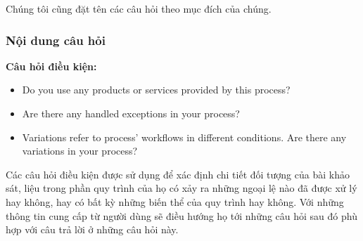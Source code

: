 \par
Chúng tôi cũng đặt tên các câu hỏi theo mục đích của chúng.
\begin{table}[H]
    \def\arraystretch{2}%
    \centering
    \caption{Tên các câu hỏi được sử dụng trong bảng khảo sát}
\end{table}

\subsubsection{Nội dung câu hỏi}

\textbf{Câu hỏi điều kiện:}
\begin{itemize}
    \item Do you use any products or services provided by this process?
    \item Are there any handled exceptions in your process?
    \item Variations refer to process’ workflows in different conditions. Are there any variations in your process?
\end{itemize}
\par
Các câu hỏi điều kiện được sử dụng để xác định chi tiết đối tượng của bài khảo sát, liệu trong phần quy trình của họ có xảy ra những ngoại lệ nào đã được xử lý hay không, hay có bất kỳ những biến thể của quy trình hay không. Với những thông tin cung cấp từ người dùng sẽ điều hướng họ tới những câu hỏi sau đó phù hợp với câu trả lời ở những câu hỏi này.

